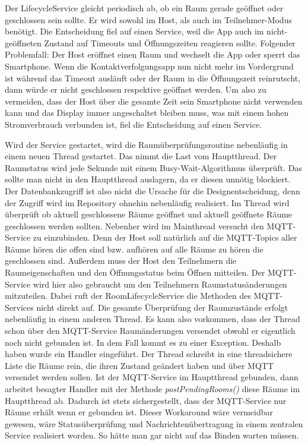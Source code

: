 Der LifecycleService gleicht periodisch ab, ob ein Raum gerade geöffnet oder geschlossen sein sollte.
Er wird sowohl im Host, als auch im Teilnehmer-Modus benötigt. 
Die Entscheidung fiel auf einen Service, weil die App auch im nicht-geöffneten Zustand auf Timeouts und Öffnungszeiten reagieren sollte.
Folgender Problemfall: Der Host eröffnet einen Raum und wechselt die App oder sperrt das Smartphone. 
Wenn die Kontaktverfolgungsapp nun nicht mehr im Vordergrund ist während das Timeout ausläuft oder der Raum in die Öffnungszeit reinrutscht, dann würde er nicht geschlossen respektive geöffnet werden. 
Um also zu vermeiden, dass der Host über die gesamte Zeit sein Smartphone nicht verwenden kann und das Display immer angeschaltet bleiben muss, was mit einem hohen Stromverbrauch verbunden ist, fiel die Entscheidung auf einen Service.

Wird der Service gestartet, wird die Raumüberprüfungsroutine nebenläufig in einem neuen Thread gestartet. Das nimmt die Last vom Hauptthread.
Der Raumstatus wird jede Sekunde mit einem Busy-Wait-Algorithmus überprüft.
Das sollte man nicht in den Hauptthread auslagern, da er diesen unnötig blockiert. 
Der Datenbankzugriff ist also nicht die Ursache für die Designentscheidung, denn der Zugriff wird im Repository ohnehin nebenläufig realisiert.
Im Thread wird überprüft ob aktuell geschlossene Räume geöffnet und aktuell geöffnete Räume geschlossen werden sollten.
Nebenher wird im Mainthread versucht den MQTT-Service zu einzubinden. 
Denn der Host soll natürlich auf die MQTT-Topics aller Räume hören die offen sind bzw. aufhören auf alle Räume zu hören die geschlossen sind.
Außerdem muss der Host den Teilnehmern die Raumeigenschaften und den Öffnungsstatus beim Öffnen mitteilen. 
Der MQTT-Service wird hier also gebraucht um den Teilnehmern Raumstatusänderungen mitzuteilen.
Dabei ruft der RoomLifecycleService die Methoden des MQTT-Services nicht direkt auf. Die gesamte Überprüfung der Raumzustände erfolgt nebenläufig in einem anderen Thread. 
Es kann also vorkommen, dass der Thread schon über den MQTT-Service Raumänderungen versendet obwohl er eigentlich noch nicht gebunden ist. 
In dem Fall kommt es zu einer Exception.
Deshalb haben wurde ein Handler eingeführt. Der Thread schreibt in eine threadsichere Liste die Räume rein, die ihren Zustand geändert haben und über MQTT versendet werden sollen. 
Ist der MQTT-Service im Hauptthread gebunden, dann arbeitet besagter Handler mit der Methode \textit{postPendingRooms()} diese Räume im Hauptthread ab. 
Dadurch ist stets sichergestellt, dass der MQTT-Service nur Räume erhält wenn er gebunden ist. 
Dieser Workaround wäre vermeidbar gewesen, wäre Statusüberprüfung und Nachrichtenübertragung in einem zentralen Service realisiert worden. So hätte man gar nicht auf das Binden warten müssen.

